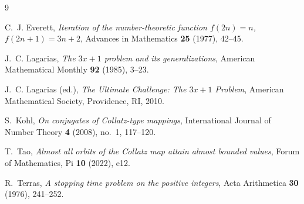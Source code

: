 \documentclass[10pt]{amsart}
\theoremstyle{definition}
\theoremstyle{remark}
\begin{document}
\begin{thebibliography}{9}

C.~J. Everett, \emph{Iteration of the number-theoretic function $f(2n)=n$, $f(2n+1)=3n+2$}, Advances in Mathematics \textbf{25} (1977), 42--45.

J.~C. Lagarias, \emph{The $3x+1$ problem and its generalizations}, American Mathematical Monthly \textbf{92} (1985), 3--23.

J.~C. Lagarias (ed.), \emph{The Ultimate Challenge: The $3x+1$ Problem}, American Mathematical Society, Providence, RI, 2010.

S.~Kohl, \emph{On conjugates of Collatz-type mappings}, International Journal of Number Theory \textbf{4} (2008), no.~1, 117--120.

T.~Tao, \emph{Almost all orbits of the Collatz map attain almost bounded values}, Forum of Mathematics, Pi \textbf{10} (2022), e12.

R.~Terras, \emph{A stopping time problem on the positive integers}, Acta Arithmetica \textbf{30} (1976), 241--252.

\end{thebibliography}
\end{document}
